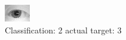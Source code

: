 \begin{figure}[h!]
\begin{center}
\includegraphics[width=0.60\columnwidth]{figures/ID1083_class_2_target_3.png}
\end{center}
\caption{ Classification: 2 actual target: 3}
\label{fig:ID1083_class_2_target_3}
\end{figure}
